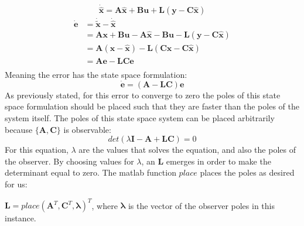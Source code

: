 \begin{equation*}
  \dot{\hat{\bm{x}}} = \bm{A}\hat{\bm{x}}+\bm{B}\bm{u} + \bm{L}(\bm{y}
  - \bm{C}\hat{\bm{x}})
\end{equation*}
\begin{align*}
  \dot{\bm{e}} &= \dot{\bm{\tilde{x}}} - \dot{\hat{\bm{x}}} \\
               &= \bm{Ax} + \bm{Bu} - \bm{A}\hat{\bm{x}} - \bm{Bu} - \bm{L}(\bm{y}- \bm{C}\hat{\bm{x}}) \\
               &= \bm{A}(\bm{x} - \hat{\bm{x}}) - \bm{L}(\bm{C}\bm{x}- \bm{C}\hat{\bm{x}}) \\
               &= \bm{Ae} - \bm{LCe} \\
\end{align*}
Meaning the error has the state space formulation:
\begin{equation}
  \dot{\bm{e}} = (\bm{A} - \bm{LC})\bm{e}
\end{equation}
As previously stated, for this error to converge to zero the poles of this state space formulation should be placed such that they are
faster than the poles of the system itself. The poles of this state
space system can be placed arbitrarily because $\{\bm{A},\bm{C}\}$ is
observable:
\begin{equation*}
  det(\lambda\bm{I} - \bm{A} +\bm{LC}) = 0
\end{equation*}
For this equation, $\lambda$ are the values that solves the equation,
and also the poles of the observer. By choosing values for $\lambda$,
an $\bm{L}$ emerges in order to make the determinant equal to
zero. The matlab function $place$ places the poles as desired for us:

$\bm{L} = place(\bm{A}^T,\bm{C}^T,\bm{\lambda})^T$, where
$\bm{\lambda}$ is the vector of the observer poles in this instance.

